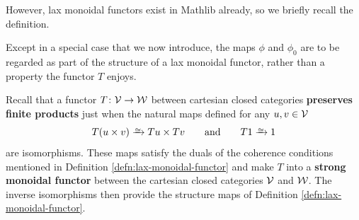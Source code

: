 However, lax monoidal functors exist in Mathlib already, so we briefly recall the definition.



Except in a special case that we now introduce, the maps $\phi$ and $\phi_0$ are to be regarded as part of the structure of a lax monoidal functor, rather than a property the functor $T$ enjoys.

Recall that a functor $T \colon {\mathord{\mathcal{V}}} \to {\mathord{\mathcal{W}}}$ between cartesian closed categories \textbf{preserves finite products} just when the natural maps defined for any $u,v \in {\mathord{\mathcal{V}}}$
\[ T(u \times v) \isoto Tu \times Tv \qquad \text{and} \qquad T1 \isoto 1\]
are isomorphisms. These maps satisfy the duals of the coherence conditions mentioned in Definition \ref{defn:lax-monoidal-functor} and  make $T$ into a \textbf{strong monoidal functor} between the cartesian closed categories ${\mathord{\mathcal{V}}}$ and ${\mathord{\mathcal{W}}}$. The inverse isomorphisms then provide the structure maps of Definition \ref{defn:lax-monoidal-functor}. %

